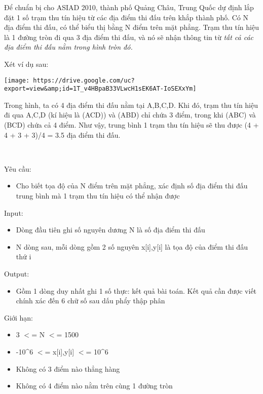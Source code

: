 

Để chuẩn bị cho ASIAD 2010, thành phố Quảng Châu, Trung Quốc dự định lắp đặt 1 số trạm thu tín hiệu từ các địa điểm thi đấu trên khắp thành phố. Có N địa điểm thi đấu, có thể biểu thị bằng N điểm trên mặt phẳng. Trạm thu tín hiệu là 1 đường tròn đi qua 3 địa điểm thi đấu, và nó sẽ nhận thông tin từ \emph{ tất cả các địa điểm thi đấu nằm trong hình tròn đó. }

Xét ví dụ sau:


\texttt{[image: https://drive.google.com/uc?export=view\&amp;id=1T\_v4HBpaB33VLwcH1sEK6AT-IoSEXxYm]}

Trong hình, ta có 4 địa điểm thi đấu nằm tại A,B,C,D. Khi đó, trạm thu tín hiệu đi qua A,C,D (kí hiệu là (ACD)) và (ABD) chỉ chứa 3 điểm, trong khi (ABC) và (BCD) chứa cả 4 điểm. Như vậy, trung bình 1 trạm thu tín hiệu sẽ thu được (4 + 4 + 3 + 3)/4 = 3.5 địa điểm thi đấu.

 

Yêu cầu:
\begin{itemize}
	\item 

Cho biết tọa độ của N điểm trên mặt phẳng, xác định số địa điểm thi đấu trung bình mà 1 trạm thu tín hiệu có thể nhận được
\end{itemize}

Input:
\begin{itemize}
	\item 

Dòng đầu tiên ghi số nguyên dương N là số địa điểm thi đấu
	\item 

N dòng sau, mỗi dòng gồm 2 số nguyên x[i],y[i] là tọa độ của điểm thi đấu thứ i
\end{itemize}

Output:
\begin{itemize}
	\item 

Gồm 1 dòng duy nhất ghi 1 số thực: kết quả bài toán. Kết quả cần được viết chính xác đến 6 chữ số sau dấu phẩy thập phân
\end{itemize}

Giới hạn:
\begin{itemize}
	\item 

3 $<$= N $<$= 1500
	\item 

-10\textasciicircum6 $<$= x[i],y[i] $<$= 10\textasciicircum6
	\item 

Không có 3 điểm nào thẳng hàng
	\item 

Không có 4 điểm nào nằm trên cùng 1 đường tròn
\end{itemize}

